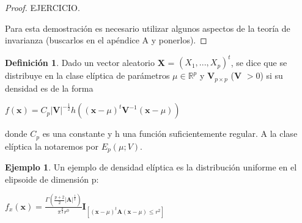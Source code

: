 \documentclass{article}
\theoremstyle{theorem-style}  %
\theoremstyle{definition}
\newtheorem{definition}{Definición}[section]
\theoremstyle{example-style}
\newtheorem{example}{Ejemplo}[section]
\begin{document}
	\begin{proof}
		EJERCICIO.
		
		Para esta demostración es necesario utilizar algunos aspectos de la teoría de invarianza (buscarlos en el apéndice A y ponerlos).
	\end{proof}

	\begin{definition}
		Dado un vector aleatorio \textbf{X} = $(X_1, ..., X_p)^t$, se dice que se distribuye en la clase elíptica de parámetros $\mu \in \mathbb{R}^p$ y \textbf{V}$_{p \times p}$ (\textbf{V} $> 0$) si su densidad es de la forma
		
		\begin{center}
		\begin{math}
			f(\textbf{x}) = C_p|\textbf{V}|^{-\frac{1}{2}}h((\textbf{x}-\mu)^t\textbf{V}^{-1}(\textbf{x}-\mu))
		\end{math}
		\end{center}
		donde $C_p$ es una constante y h una función suficientemente regular. A la clase elíptica la notaremos por $E_p(\mu; V)$.
	\end{definition}

	\begin{example}
		Un ejemplo de densidad elíptica es la distribución uniforme en el elipsoide de dimensión p:
		
		\begin{center}
			\begin{math}
				f_x(\textbf{x}) = \frac{\Gamma(\frac{p+2}{2}|\textbf{A}|^\frac{1}{2})}{\pi^\frac{p}{2}r^0}\textbf{I}_{[(\textbf{x}-\mu)^t\textbf{A}(\textbf{x}-\mu)\leq r^2]}
			\end{math}
		\end{center}

	\end{example}
\end{document}
